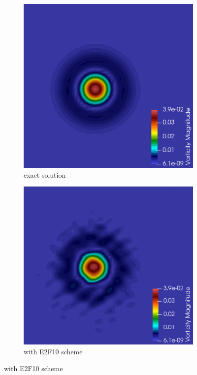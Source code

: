 \documentclass{hcmut-report}
\begin{document}
    \begin{figure}[H]
     \centering  
     \begin{subfigure}[b]{0.35\textwidth}
         \centering
         \includegraphics[width=\textwidth]{graphics/vorticityini.png}
         \caption{exact solution}
         \label{fig:3.1}
     \end{subfigure}
     \hspace{0.5cm}
     \begin{subfigure}[b]{0.35\textwidth}
         \centering
         \includegraphics[width=\textwidth]{graphics/vorticityE2.png}
         \caption{with E2F10 scheme}
         \label{fig:3.1}
     \end{subfigure}


\end{figure}
\end{document}
